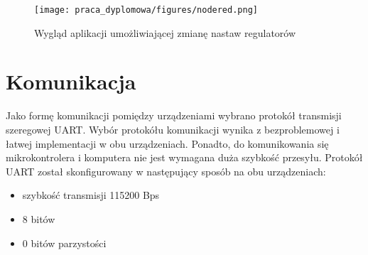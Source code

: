 \begin{figure}
    \centering
    \texttt{[image: praca\_dyplomowa/figures/nodered.png]}
    \caption{Wygląd aplikacji umożliwiającej zmianę nastaw regulatorów}
    \label{fig:nodered}
\end{figure}

\section{Komunikacja}
Jako formę komunikacji pomiędzy urządzeniami wybrano protokół transmisji szeregowej UART. Wybór protokółu komunikacji wynika z bezproblemowej i łatwej implementacji w obu urządzeniach. Ponadto, do komunikowania się mikrokontrolera i komputera nie jest wymagana duża szybkość przesyłu. Protokół UART został skonfigurowany w następujący sposób na obu urządzeniach:
\begin{itemize}
    \item szybkość transmisji 115200 Bps
    \item 8 bitów
    \item 0 bitów parzystości
\end{itemize}

